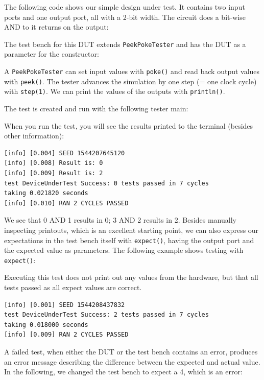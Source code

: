 \documentclass[%
    10pt,
    headinclude, footexclude,
    openright, %
    notitlepage,
    cleardoubleempty,
    headsepline,
    pointlessnumbers,
    bibtotoc, idxtotoc,
    ]{scrbook}
\newcommand{\code}[1]{{\small{\texttt{#1}}}}
\begin{document}
The following code shows our simple design under test. It contains two input
ports and one output port, all with a 2-bit width. The circuit does a bit-wise AND
to it returns on the output:


\noindent The test bench for this DUT extends \code{PeekPokeTester} and has
the DUT as a parameter for the constructor:


\noindent A \code{PeekPokeTester} can set input values with \code{poke()} and
read back output values with \code{peek()}. The tester advances the simulation by one
step (= one clock cycle) with \code{step(1)}.
We can print the values of the outputs with \code{println()}.

The test is created and run with the following tester main:


\noindent When you run the test, you will see the results printed to the terminal
(besides other information):

\begin{verbatim}
[info] [0.004] SEED 1544207645120
[info] [0.008] Result is: 0
[info] [0.009] Result is: 2
test DeviceUnderTest Success: 0 tests passed in 7 cycles
taking 0.021820 seconds
[info] [0.010] RAN 2 CYCLES PASSED
\end{verbatim}

\noindent We see that 0 AND 1 results in 0; 3 AND 2 results in 2.
Besides manually inspecting printouts, which is an excellent starting point, we can also
express our expectations in the test bench itself with \code{expect()},
having the output port and the expected value as parameters.
The following example shows testing with \code{expect()}:


\noindent Executing this test does not print out any values from the hardware,
but that all tests passed as all expect values are correct.

\begin{verbatim}
[info] [0.001] SEED 1544208437832
test DeviceUnderTest Success: 2 tests passed in 7 cycles
taking 0.018000 seconds
[info] [0.009] RAN 2 CYCLES PASSED
\end{verbatim}

\noindent A failed test, when either the DUT or the test bench contains an error,
produces an error message describing the difference between the expected and actual
value. In the following, we changed the test bench to expect a 4, which is an error:
\end{document}
